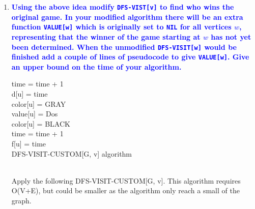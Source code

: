 \documentclass[11pt]{article}
\begin{document}
\begin{enumerate}
\begin{enumerate}
    \item \textbf{\textcolor{blue}{Using the above idea modify {\tt DFS-VIST[v]} 
    to find who wins the original game.  In your modified algorithm
    there will be an extra function {\tt VALUE[w]} which is originally
    set to {\tt NIL} for all vertices $w$, representing that the winner
    of the game starting at $w$ has not yet been determined.  When
    the unmodified {\tt DFS-VISIT[w]} would be finished add a couple
    of lines of pseudocode to give  {\tt VALUE[w]}.
    Give an upper bound on the time of your algorithm.}}
        \begin{algorithm}
            time = time + 1 \\
            d[u] = time \\
            color[u] = GRAY \\
            value[u] = Dos \\
            color[u] = BLACK \\
            time = time + 1 \\
            f[u] = time \\
            \caption{DFS-VISIT-CUSTOM[G, v] algorithm}
        \end{algorithm}
        \\ Apply the following DFS-VISIT-CUSTOM[G, v]. This algorithm requires O(V+E), but could be smaller as the algorithm only reach a small of the graph.
        
        
    
\end{enumerate}

\end{enumerate}
\end{document}
